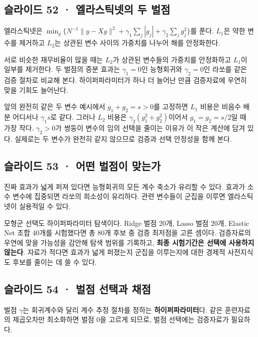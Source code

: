 \documentclass[11pt,a4paper]{article}
\begin{document}
\subsection{슬라이드 52 · 엘라스틱넷의 두 벌점}
엘라스틱넷은 $\min_g\{N^{-1}\|y-Xg\|^2+\gamma_1\sum_j|g_j|+\gamma_2\sum_jg_j^2\}$를 푼다. $L_1$은 약한 변수를 제거하고 $L_2$는 상관된 변수 사이의 가중치를 나누어 해를 안정화한다.\par

서로 비슷한 재무비율이 많을 때는 $L_2$가 상관된 변수들의 가중치를 안정화하고 $L_1$이 일부를 제거한다. 두 벌점의 증분 효과는 $\gamma_1=0$인 능형회귀와 $\gamma_2=0$인 라쏘를 같은 검증 절차로 비교해 본다. 하이퍼파라미터가 하나 더 늘어난 만큼 검증자료에 우연히 맞을 기회도 늘어난다.\par

앞의 완전히 같은 두 변수 예시에서 $g_1+g_2=s>0$를 고정하면 $L_1$ 비용은 비음수 배분 어디서나 $\gamma_1s$로 같다. 그러나 $L_2$ 비용은 $\gamma_2(g_1^2+g_2^2)$이어서 $g_1=g_2=s/2$일 때 가장 작다. $\gamma_2>0$가 쌍둥이 변수의 임의 선택을 줄이는 이유가 이 작은 계산에 담겨 있다. 실제로는 두 변수가 완전히 같지 않으므로 검증과 선택 안정성을 함께 본다.\par

\subsection{슬라이드 53 · 어떤 벌점이 맞는가}
진짜 효과가 넓게 퍼져 있다면 능형회귀의 모든 계수 축소가 유리할 수 있다. 효과가 소수 변수에 집중되면 라쏘의 희소성이 유리하다. 관련 변수들이 군집을 이루면 엘라스틱넷이 실용적일 수 있다.\par

모형군 선택도 하이퍼파라미터 탐색이다. Ridge 벌점 20개, Lasso 벌점 20개, Elastic Net 조합 40개를 시험했다면 총 80개 후보 중 검증 최저점을 고른 셈이다. 검증자료의 우연에 맞을 가능성을 감안해 탐색 범위를 기록하고, \textbf{최종 시험기간은 선택에 사용하지 않는다}. 자료가 적다면 효과가 넓게 퍼졌는지 군집을 이루는지에 대한 경제적 사전지식도 후보를 줄이는 데 쓸 수 있다.\par

\subsection{슬라이드 54 · 벌점 선택과 채점}
벌점 $\gamma$는 회귀계수와 달리 계수 추정 절차를 정하는 \textbf{하이퍼파라미터}다. 같은 훈련자료의 제곱오차만 최소화하면 벌점 0을 고르게 되므로, 벌점 선택에는 검증자료가 필요하다.\par
\end{document}
